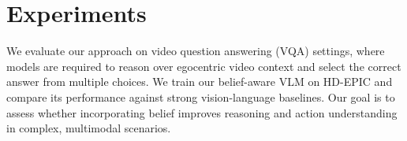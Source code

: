 \documentclass[letterpaper, 10 pt, conference]{ieeeconf}  %
\begin{document}
















\section{Experiments}

We evaluate our approach on video question answering (VQA) settings, where models are required to reason over egocentric video context and select the correct answer from multiple choices. We train our belief-aware VLM on HD-EPIC and compare its performance against strong vision-language baselines. Our goal is to assess whether incorporating belief improves reasoning and action understanding in complex, multimodal scenarios.
\end{document}
